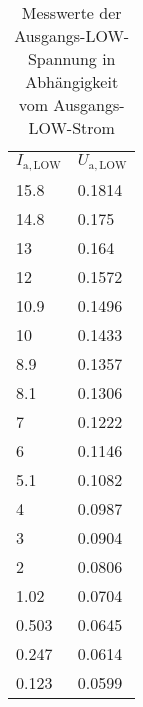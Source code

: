 \begin{table}[h]
    \centering
\begin{minipage}[t]{0.48\linewidth}\centering

    \begin{tabular}{ll}
      \rowcolor{gray0} 
      $I_\mathrm{a, LOW}$ & $U_\mathrm{a, LOW}$ \\
      15.8                & 0.1814              \\
      14.8                & 0.175               \\
      13                  & 0.164               \\
      12                  & 0.1572              \\
      10.9                & 0.1496              \\
      10                  & 0.1433              \\
      8.9                 & 0.1357              \\
      8.1                 & 0.1306              \\
      7                   & 0.1222              \\
      6                   & 0.1146              \\
      5.1                 & 0.1082              \\
      4                   & 0.0987              \\
      3                   & 0.0904              \\
      2                   & 0.0806              \\
      1.02                & 0.0704              \\
      0.503               & 0.0645              \\
      0.247               & 0.0614              \\
      0.123               & 0.0599             
    \end{tabular}
  \caption{Messwerte der Ausgangs-LOW-Spannung in Abhängigkeit vom Ausgangs-LOW-Strom}
  \label{tab:aus_low}

\end{minipage}\hfill%
\begin{minipage}[t]{0.48\linewidth}\centering


\end{minipage}
\end{table}
